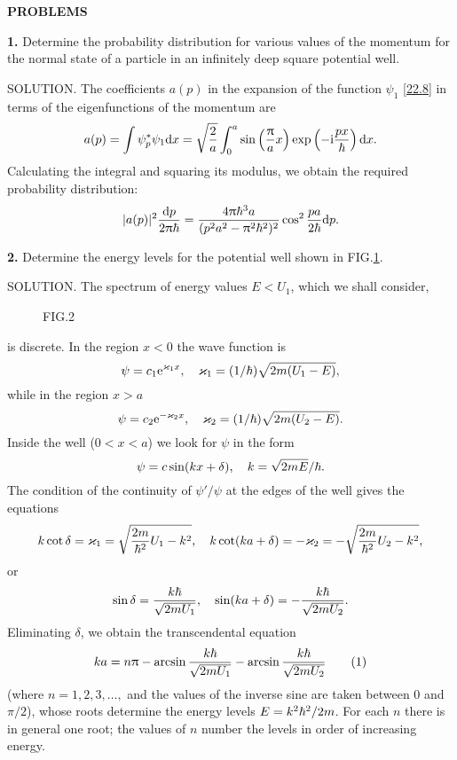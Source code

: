 {\small 

\textbf{PROBLEMS}


\textbf{1.} Determine the probability distribution for various values of the momentum for the normal state of a particle in an infinitely deep square potential well.





SOLUTION. The coefficients $ a (p) $ in the expansion of the function $\psi_1$ \eqref{22.8} in terms of the eigenfunctions of the momentum are
\[ a(p)=\int\psi_p^*\psi_1\mathrm{d} x=\sqrt{\frac{2}{a}}\int_0^a\sin\left(\frac{\uppi}{a}x  \right)\exp\left(  -\mathrm{i}\frac{px}{\hbar}\right)\mathrm{d} x. \]
Calculating the integral and squaring its modulus, we obtain the required probability distribution:
\[ |a(p)|^2\frac{\mathrm{d} p}{2\uppi\hbar}=\frac{4\uppi\hbar^3a}{(p^2a^2-\uppi^2\hbar^2)^2}\cos^2\frac{pa}{2\hbar}\mathrm{d} p. \]




\textbf{2.} Determine the energy levels for the potential well shown in FIG.\ref{Fig.2}.


SOLUTION. The spectrum of energy values $ E < U_1 $, which we shall consider, 
\begin{wrapfigure}[11]{l}[0cm]{0cm}
	\caption{FIG.2}\label{Fig.2}
\end{wrapfigure}
is discrete. In the region $ x < 0 $ the wave function is
\[ \psi=c_1\mathrm{e}^{\varkappa_1 x},\quad \varkappa_1=(1/\hbar )\sqrt{2m(U_1-E)},\]
while in the region $ x > a $
\[ \psi=c_2\mathrm{e}^{-\varkappa_2 x},\quad \varkappa_2=(1/\hbar )\sqrt{2m(U_2-E)}. \]
Inside the well ($ 0 < x < a $) we look for $\psi$ in the form
\[ \psi=c\sin(kx+\delta),\quad k=\sqrt{2mE}/\hbar. \]
The condition of the continuity of $ \psi'/\psi $ at the edges of the well gives the equations
\[ k\cot\delta=\varkappa_1=\sqrt{\frac{2m}{\hbar^2}U_1-k^2},\quad k\cot(ka+\delta)=-\varkappa_2=-\sqrt{\frac{2m}{\hbar^2}U_2-k^2} ,\]
or
\[ \sin\delta=\frac{k\hbar}{\sqrt{2mU_1}},\quad \sin(ka+\delta)=-\frac{k\hbar}{\sqrt{2mU_2}} .\]
Eliminating $\delta$, we obtain the transcendental equation
\begin{equation}\label{3-(1)}
ka=n\uppi-\arcsin\frac{k\hbar}{\sqrt{2mU_1}}-\arcsin\frac{k\hbar}{\sqrt{2mU_2}}\tag{1}
\end{equation}
(where $ n = 1, 2, 3,\dots, $ and the values of the inverse sine are taken between $ 0 $ and $ \pi/2 $), whose roots determine the energy levels $ E = k^2\hbar^2/2m $. For each $ n $ there is in general one root; the values of $ n $ number the levels in order of increasing energy.

}

